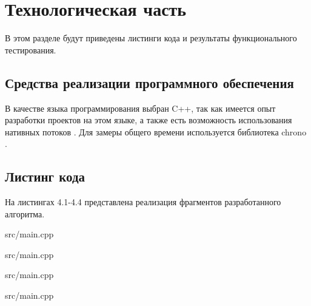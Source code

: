 \chapter{Технологическая часть}
В этом разделе будут приведены листинги кода и результаты функционального тестирования.

\section{Средства реализации программного обеспечения}
В качестве языка программирования выбран C++, так как имеется опыт разработки проектов на этом языке, 
а также есть возможность использования нативных потоков \cite{thread}.
Для замеры общего времени используется библиотека chrono \cite{time}.

\section{Листинг кода}
\FloatBarrier
На листингах 4.1-4.4 представлена реализация фрагментов разработанного алгоритма.

\begin{lstinputlisting}[language=C++, caption=Реализация классического алгоритма, linerange={16-55}, 
	basicstyle=\footnotesize\ttfamily, frame=single,breaklines=true]{src/main.cpp}
\end{lstinputlisting}
\FloatBarrier

\FloatBarrier
\begin{lstinputlisting}[language=C++, caption=Реализация схемы подсчёта среднего арифметического для каждого потока, 
	linerange={64-74}, basicstyle=\footnotesize\ttfamily, frame=single,breaklines=true]{src/main.cpp}
\end{lstinputlisting}
\FloatBarrier

\FloatBarrier
\begin{lstinputlisting}[language=C++, caption=Реализация схемы подсчёта корреляции Пирсона, linerange={90-125}, 
	basicstyle=\footnotesize\ttfamily, frame=single, breaklines=true]{src/main.cpp}
\end{lstinputlisting}
\FloatBarrier

\FloatBarrier
\begin{lstinputlisting}[language=C++, caption= Общая реализация алгоритма с использованием потоков, linerange={127-167}, 
	basicstyle=\footnotesize\ttfamily, frame=single, breaklines=true]{src/main.cpp}
\end{lstinputlisting}
\FloatBarrier


